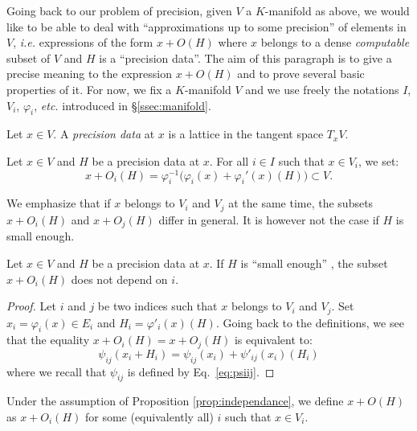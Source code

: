 \documentclass{amsart}
\begin{document}

Going back to our problem of precision, given $V$ a $K$-manifold as 
above, we would like to be able to deal with ``approximations up to some 
precision'' of elements in $V$, \emph{i.e.} expressions of the form $x + 
O(H)$ where $x$ belongs to a dense \emph{computable} subset of $V$ and 
$H$ is a ``precision data''.
The aim of this paragraph is to give a precise meaning to the expression 
$x + O(H)$ and to prove several basic properties of it.
For now, we fix a $K$-manifold $V$ and we use freely the notations $I$, 
$V_i$, $\varphi_i$, \emph{etc.} introduced in \S \ref{ssec:manifold}.

\begin{deftn}
Let $x \in V$. 
A \emph{precision data} at $x$ is a lattice in the tangent space 
$T_x V$.
\end{deftn}

\begin{deftn}
Let $x \in V$ and $H$ be a precision data at $x$.
For all $i \in I$ such that $x \in V_i$, we set:
$$x + O_i(H) = \varphi_i^{-1}\big(\varphi_i(x) + \varphi_i'(x)(H)\big) 
\subset V.$$
\end{deftn}

We emphasize that if $x$ belongs to $V_i$ and $V_j$ at the same time,
the subsets $x + O_i(H)$ and $x + O_j(H)$ differ in general. It is 
however not the case if $H$ is small enough.

\begin{prop}
\label{prop:independance}
Let $x \in V$ and $H$ be a precision data at $x$.
If $H$ is ``small enough'' , the subset $x + 
O_i(H)$ does not depend on $i$.
\end{prop}

\begin{proof}
Let $i$ and $j$ be two indices such that $x$ belongs to $V_i$ and $V_j$. 
Set $x_i = \varphi_i(x) \in E_i$ and $H_i = \varphi'_i(x)(H)$. Going 
back to the definitions, we see that the equality $x + O_i(H) = x + 
O_j(H)$ is equivalent to:
$$\psi_{ij}(x_i + H_i) = \psi_{ij}(x_i) + \psi'_{ij}(x_i)(H_i)$$ 
where we recall that $\psi_{ij}$ is defined by Eq.~\eqref{eq:psiij}.
\end{proof}

Under the assumption of Proposition \ref{prop:independance}, we define
$x + O(H)$ as $x + O_i(H)$ for some (equivalently all) $i$ such that
$x \in V_i$.
\end{document}
